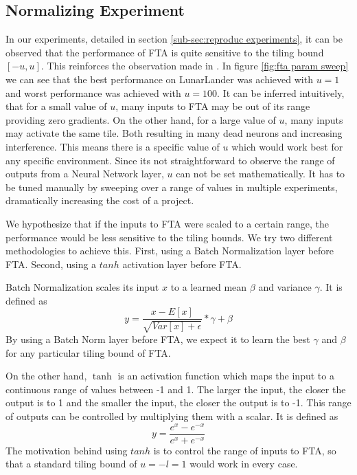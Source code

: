 \documentclass{article}
\begin{document}
\subsection{Normalizing Experiment} \label{sub-sec:normalize experiments}
In our experiments, detailed in section \ref{sub-sec:reproduc experiments}, it can be observed that the performance of FTA is quite sensitive to the tiling bound $[-u, u]$. 
This reinforces the observation made in \cite{pan2019fuzzy}. 
In figure \ref{fig:fta param sweep} we can see that the best performance on LunarLander was achieved with $u=1$ and worst performance was achieved with $u=100$. 
It can be inferred intuitively, that for a small value of $u$, many inputs to FTA may be out of its range providing zero gradients. 
On the other hand, for a large value of $u$, many inputs may activate the same tile. 
Both resulting in many dead neurons and increasing interference. 
This means there is a specific value of $u$ which would work best for any specific environment. 
Since its not straightforward to observe the range of outputs from a Neural Network layer, $u$ can not be set mathematically. 
It has to be tuned manually by sweeping over a range of values in multiple experiments, dramatically increasing the cost of a project.

We hypothesize that if the inputs to FTA were scaled to a certain range, the performance would be less sensitive to the tiling bounds. 
We try two different methodologies to achieve this. 
First, using a Batch Normalization \cite[]{ioffe2015batch} layer before FTA. 
Second, using a $tanh$ activation layer before FTA. 

Batch Normalization scales its input $x$ to a learned mean $\beta$ and variance $\gamma$. 
It is defined as 
\begin{equation}
    y = \frac{x-E[x]}{\sqrt{Var[x] + \epsilon}} * \gamma + \beta
    \label{eq:batchnorm}
\end{equation}
By using a Batch Norm layer before FTA, we expect it to learn the best $\gamma$ and $\beta$ for any particular tiling bound of FTA.

On the other hand, $\tanh$ is an activation function which maps the input to a continuous range of values between -1 and 1. 
The larger the input, the closer the output is to 1 and the smaller the input, the closer the output is to -1. 
This range of outputs can be controlled by multiplying them with a scalar. 
It is defined as 
 \begin{equation}
    y = \frac{e^x-e^{-x}}{e^x+e^{-x}}
    \label{eq:tanh}
 \end{equation}
The motivation behind using $tanh$ is to control the range of inputs to FTA, so that a standard tiling bound of $u = -l = 1$ would work in every case.
\end{document}
